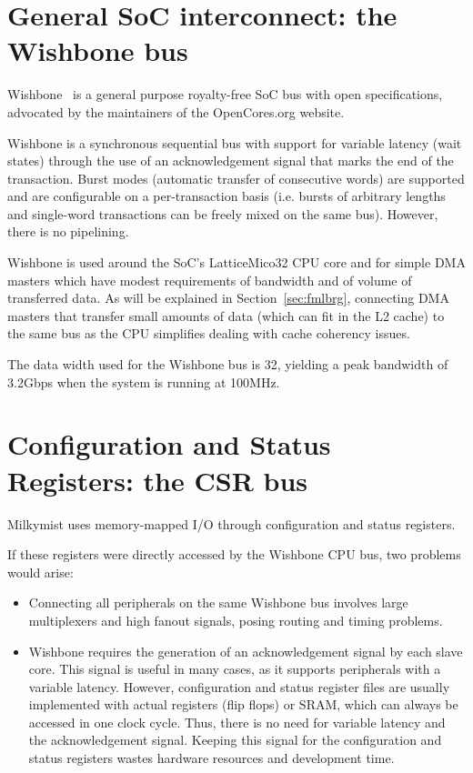 \documentclass[a4paper,11pt]{kthesis}
\begin{document}
\section{General SoC interconnect: the Wishbone bus}
Wishbone~\cite{wishbone} is a general purpose royalty-free SoC bus with open specifications, advocated by the maintainers of the OpenCores.org website.

Wishbone is a synchronous sequential bus with support for variable latency (wait states) through the use of an acknowledgement signal that marks the end of the transaction. Burst modes (automatic transfer of consecutive words) are supported and are configurable on a per-transaction basis (i.e. bursts of arbitrary lengths and single-word transactions can be freely mixed on the same bus). However, there is no pipelining.

Wishbone is used around the SoC's LatticeMico32 CPU core and for simple DMA masters which have modest requirements of bandwidth and of volume of transferred data. As will be explained in Section~\ref{sec:fmlbrg}, connecting DMA masters that transfer small amounts of data (which can fit in the L2 cache) to the same bus as the CPU simplifies dealing with cache coherency issues.

The data width used for the Wishbone bus is 32, yielding a peak bandwidth of 3.2Gbps when the system is running at 100MHz.

\section{Configuration and Status Registers: the CSR bus}
Milkymist uses memory-mapped I/O through configuration and status registers.

If these registers were directly accessed by the Wishbone CPU bus, two problems would arise:
\begin{itemize}
\item Connecting all peripherals on the same Wishbone bus involves large multiplexers and high fanout signals, posing routing and timing problems.
\item Wishbone requires the generation of an acknowledgement signal by each slave core. This signal is useful in many cases, as it supports peripherals with a variable latency. However, configuration and status register files are usually implemented with actual registers (flip flops) or SRAM, which can always be accessed in one clock cycle. Thus, there is no need for variable latency and the acknowledgement signal. Keeping this signal for the configuration and status registers wastes hardware resources and development time.
\end{itemize}
\end{document}
